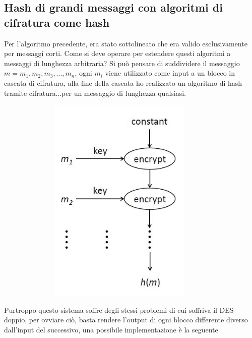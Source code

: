 \subsection{Hash di grandi messaggi con algoritmi di cifratura come hash}
Per l'algoritmo precedente, era stato sottolineato che era valido esclusivamente per messaggi corti.
Come si deve operare per estendere questi algoritmi a messaggi di lunghezza arbitraria?
Si può pensare di suddividere il messaggio $m = m_{1},m_{2},m_{3},...,m_{n}$, ogni $m_{i}$ viene utilizzato come input a un blocco in cascata di cifratura, alla fine della cascata ho realizzato un algoritmo di hash tramite cifratura...per un messaggio di lunghezza qualsiasi.\\
\begin{figure}
	\begin{center}
	{\includegraphics[height=10cm, width=10cm, keepaspectratio]{Immagini/hash/schema_des_come_hash_1.JPG}}
	\end{center}
\end{figure}
Purtroppo questo sistema soffre degli stessi problemi di cui soffriva il DES doppio, per ovviare ciò, basta rendere l'output di ogni blocco differente diverso dall'input del successivo, una possibile implementazione è la seguente
